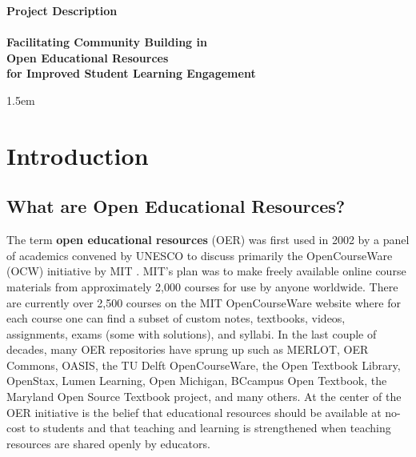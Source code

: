 \documentclass[11pt]{article}
\begin{document}
\begin{center}
\textbf{\Large Project Description}\\[0.25cm]
\hrulefill\\[0.25cm]
\textbf{\Large Facilitating Community Building in \\[0.2ex] Open Educational Resources \\[0.8ex] for Improved Student Learning Engagement}\\
\hrulefill
\end{center}
\baselineskip 1.5em

\section{Introduction}

\subsection{What are Open Educational Resources?}
The term \textbf{open educational resources} (OER) was first used in 2002 by a panel of academics convened by UNESCO to discuss primarily the OpenCourseWare (OCW) initiative by MIT \cite{unescoforum:02, oerguidelines}.  MIT's plan was to make freely available online course materials from approximately 2,000 courses for use by anyone worldwide.  There are currently over 2,500 courses on the MIT OpenCourseWare website where for each course one can find a subset of custom notes, textbooks, videos, assignments, exams (some with solutions), and syllabi.  In the last couple of decades, many OER repositories have sprung up such as MERLOT, OER Commons, OASIS, the TU Delft OpenCourseWare, the Open Textbook Library, OpenStax, Lumen Learning, Open Michigan, BCcampus Open Textbook, the Maryland Open Source Textbook project, and many others.  At the center of the OER initiative is the belief that educational resources should be available at no-cost to students and that teaching and learning is strengthened when teaching resources are shared openly by educators.
\end{document}
